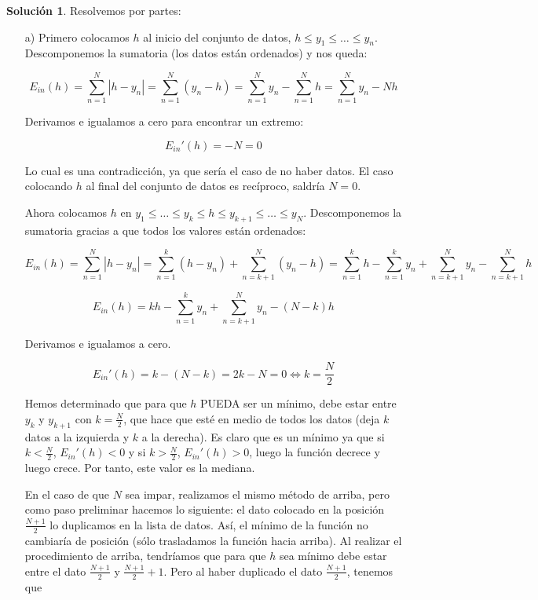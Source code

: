 \documentclass[a4paper, 11pt]{article}
\theoremstyle{definition}
\newtheorem*{solucion}{Solución}
\begin{document}
  \begin{solucion}

    Resolvemos por partes:
    \begin{enumerate}

      \item[a)]Primero colocamos $h$ al inicio del conjunto de datos, $h \leq y_1 \leq \ldots \leq y_n$. Descomponemos la sumatoria (los datos están ordenados) y nos queda:

      $$ E_{in}(h) = \sum_{n=1}^N{|h-y_n|} = \sum_{n=1}^N{(y_n-h)} = \sum_{n=1}^N{y_n} - \sum_{n=1}^N{h} = \sum_{n=1}^N{y_n} - Nh$$

      Derivamos e igualamos a cero para encontrar un extremo:

      $$E_{in}'(h) = -N = 0 $$

      Lo cual es una contradicción, ya que sería el caso de no haber datos. El caso colocando $h$ al final del conjunto de datos es recíproco, saldría $N=0$.

      Ahora colocamos $h$ en $y_1 \leq \ldots \leq y_k \leq h \leq y_{k+1} \leq \ldots \leq y_N$. Descomponemos la sumatoria gracias a que todos los valores están ordenados:

      $$E_{in}(h) = \sum_{n=1}^N{|h-y_n|} = \sum_{n=1}^k{(h-y_n)} + \sum_{n=k+1}^N{(y_n-h)} = \sum_{n=1}^k{h}-\sum_{n=1}^k{y_n} + \sum_{n=k+1}^N{y_n}-\sum_{n=k+1}^N{h}$$

      $$E_{in}(h)= kh-\sum_{n=1}^k{y_n} + \sum_{n=k+1}^N{y_n}-(N-k)h$$

      Derivamos e igualamos a cero.

      $$E_{in}'(h) = k - (N - k) = 2k - N = 0 \Leftrightarrow k = \frac{N}{2}$$

      Hemos determinado que para que $h$ PUEDA ser un mínimo, debe estar entre $y_k$ y $y_{k+1}$ con $k=\frac{N}{2}$, que hace que esté en medio de todos los datos (deja $k$ datos a la izquierda y $k$ a la derecha). Es claro que es un mínimo ya que si $k < \frac{N}{2}$, $E_{in}'(h) < 0$ y si $k > \frac{N}{2}$, $E_{in}'(h) > 0$, luego la función decrece y luego crece.    Por tanto, este valor es la mediana.

      En el caso de que $N$ sea impar, realizamos el mismo método de arriba, pero como paso preliminar hacemos lo siguiente: el dato colocado en la posición $\frac{N+1}{2}$ lo duplicamos en la lista de datos. Así, el mínimo de la función no cambiaría de posición (sólo trasladamos la función hacia arriba). Al realizar el procedimiento de arriba, tendríamos que para que $h$ sea mínimo debe estar entre el dato $\frac{N+1}{2}$ y $\frac{N+1}{2} + 1$. Pero al haber duplicado el dato $\frac{N+1}{2}$, tenemos que


\end{enumerate}
\end{solucion}
\end{document}
